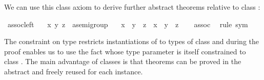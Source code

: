 \begin{isabellebody}
\begin{isamarkuptext}
We can use this class axiom to derive further abstract theorems
relative to class :%
\end{isamarkuptext}%
\isamarkuptrue%
\isamarkupfalse%
\ assoc{}left{}\isanewline
\ \ \ x\ y\ z\ {}{}\ {}{}a{}semigroup{}\isanewline
\ \ \ {}x\ {}\ {}y\ {}\ z{}\ {}\ {}x\ {}\ y{}\ {}\ z{}\isanewline
%
\isadelimproof
\ \ %
\endisadelimproof
%
\isatagproof
{}\isamarkupfalse%
\ assoc\ \isamarkupfalse%
\ {}rule\ sym{}%
\endisatagproof
{\isafoldproof}%
%
\isadelimproof
%
\endisadelimproof
%
\begin{isamarkuptext}%
\noindent The  constraint on type  restricts instantiations of  to types of class
 and during the proof enables us to use the fact
\hyperlink{fact.assoc}{\mbox{}} whose type parameter is itself constrained to class
.  The main advantage of classes is that theorems
can be proved in the abstract and freely reused for each instance.


\end{isamarkuptext}
\end{isabellebody}
